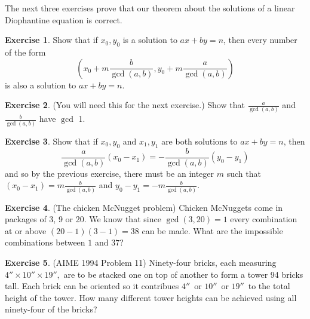 \documentclass[11pt]{article}
\theoremstyle{definition}
\newtheorem{exercise}{Exercise}
\numberwithin{thm}{section}
\begin{document}
\newpage

The next three exercises prove that our theorem about the solutions of a linear Diophantine equation is correct.

\begin{exercise} Show that if $x_0, y_0$ is a solution to $ax+by=n$, then every number of the form
\[
	\left(x_0 + m\frac{b}{\gcd(a,b)}, y_0 + m\frac{a}{\gcd(a,b)} \right)
\]
is also a solution to $ax+by=n$.
\end{exercise}

\begin{exercise} (You will need this for the next exercise.) Show that $\frac{a}{\gcd(a,b)}$ and $\frac{b}{\gcd(a,b)}$ have $\gcd$ 1.
\end{exercise}

\begin{exercise} Show that if $x_0, y_0$ and $x_1, y_1$ are both solutions to $ax+by=n$, then
\[
	\frac{a}{\gcd(a,b)}(x_0 - x_1) = -\frac{b}{\gcd(a,b)}(y_0 - y_1)
\]
and so by the previous exercise, there must be an integer $m$ such that $(x_0 - x_1) = m \frac{b}{\gcd(a,b)}$ and $y_0-y_1 = -m \frac{b}{\gcd(a,b)}$.
\end{exercise}

\begin{exercise} (The chicken McNugget problem) Chicken McNuggets come in packages of 3, 9 or 20. We know that since $\gcd(3,20) = 1$ every combination at or above $(20-1)(3-1) = 38$ can be made. What are the impossible combinations between $1$ and $37$?
\end{exercise}

\begin{exercise} (AIME 1994 Problem 11) Ninety-four bricks, each measuring $4''\times10''\times19'',$ are to be stacked one on top of another to form a tower 94 bricks tall. Each brick can be oriented so it contribues $4''\,$ or $10''\,$ or $19''\,$ to the total height of the tower. How many different tower heights can be achieved using all ninety-four of the bricks?
\end{exercise}
\end{document}
